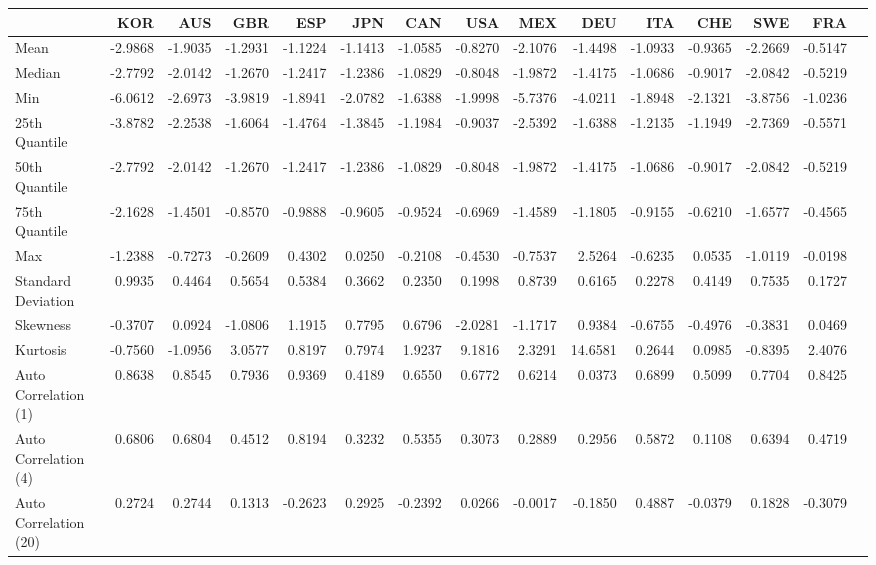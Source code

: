 \begin{tabular}{l|r|r|r|r|r|r|r|r|r|r|r|r|r|r}
\toprule
{} &     KOR &     AUS &     GBR &     ESP &     JPN &     CAN &     USA &     MEX &      DEU &     ITA &     CHE &     SWE &     FRA \\
\midrule
Mean                  & -2.9868 & -1.9035 & -1.2931 & -1.1224 & -1.1413 & -1.0585 & -0.8270 & -2.1076 &  -1.4498 & -1.0933 & -0.9365 & -2.2669 & -0.5147 \\
Median                & -2.7792 & -2.0142 & -1.2670 & -1.2417 & -1.2386 & -1.0829 & -0.8048 & -1.9872 &  -1.4175 & -1.0686 & -0.9017 & -2.0842 & -0.5219 \\
Min                   & -6.0612 & -2.6973 & -3.9819 & -1.8941 & -2.0782 & -1.6388 & -1.9998 & -5.7376 &  -4.0211 & -1.8948 & -2.1321 & -3.8756 & -1.0236 \\
25th Quantile         & -3.8782 & -2.2538 & -1.6064 & -1.4764 & -1.3845 & -1.1984 & -0.9037 & -2.5392 &  -1.6388 & -1.2135 & -1.1949 & -2.7369 & -0.5571 \\
50th Quantile         & -2.7792 & -2.0142 & -1.2670 & -1.2417 & -1.2386 & -1.0829 & -0.8048 & -1.9872 &  -1.4175 & -1.0686 & -0.9017 & -2.0842 & -0.5219 \\
75th Quantile         & -2.1628 & -1.4501 & -0.8570 & -0.9888 & -0.9605 & -0.9524 & -0.6969 & -1.4589 &  -1.1805 & -0.9155 & -0.6210 & -1.6577 & -0.4565 \\
Max                   & -1.2388 & -0.7273 & -0.2609 &  0.4302 &  0.0250 & -0.2108 & -0.4530 & -0.7537 &   2.5264 & -0.6235 &  0.0535 & -1.0119 & -0.0198 \\
Standard Deviation    &  0.9935 &  0.4464 &  0.5654 &  0.5384 &  0.3662 &  0.2350 &  0.1998 &  0.8739 &   0.6165 &  0.2278 &  0.4149 &  0.7535 &  0.1727 \\
Skewness              & -0.3707 &  0.0924 & -1.0806 &  1.1915 &  0.7795 &  0.6796 & -2.0281 & -1.1717 &   0.9384 & -0.6755 & -0.4976 & -0.3831 &  0.0469 \\
Kurtosis              & -0.7560 & -1.0956 &  3.0577 &  0.8197 &  0.7974 &  1.9237 &  9.1816 &  2.3291 &  14.6581 &  0.2644 &  0.0985 & -0.8395 &  2.4076 \\
Auto Correlation (1)  &  0.8638 &  0.8545 &  0.7936 &  0.9369 &  0.4189 &  0.6550 &  0.6772 &  0.6214 &   0.0373 &  0.6899 &  0.5099 &  0.7704 &  0.8425 \\
Auto Correlation (4)  &  0.6806 &  0.6804 &  0.4512 &  0.8194 &  0.3232 &  0.5355 &  0.3073 &  0.2889 &   0.2956 &  0.5872 &  0.1108 &  0.6394 &  0.4719 \\
Auto Correlation (20) &  0.2724 &  0.2744 &  0.1313 & -0.2623 &  0.2925 & -0.2392 &  0.0266 & -0.0017 &  -0.1850 &  0.4887 & -0.0379 &  0.1828 & -0.3079 \\
\bottomrule
\end{tabular}
